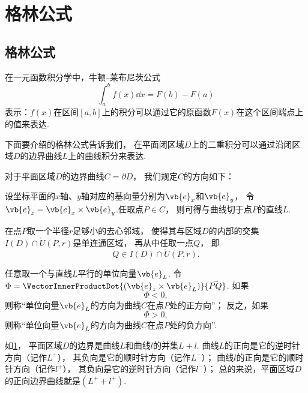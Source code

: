 \section{格林公式}
\subsection{格林公式}
在一元函数积分学中，牛顿--莱布尼茨公式\[
	\int_a^b f(x) \dd{x} = F(b) - F(a)
\]表示：\(f(x)\)在区间\([a,b]\)上的积分可以通过它的原函数\(F(x)\)在这个区间端点上的值来表达.

下面要介绍的格林公式告诉我们，
在平面闭区域\(D\)上的二重积分可以通过沿闭区域\(D\)的边界曲线\(L\)上的曲线积分来表达.

\begin{definition}\label{definition:线积分与面积分.平面闭区域的边界曲线的取向}
对于平面区域\(D\)的边界曲线\(C = \partial D\)，
我们规定\(C\)的方向如下：

设坐标平面的\(x\)轴、\(y\)轴对应的基向量分别为\(\vb{e}_x\)和\(\vb{e}_y\)，
令\(\vb{e}_z = \vb{e}_x \times \vb{e}_y\).任取点\(P \in C\)，
则可得与曲线切于点\(P\)的直线\(L\).

在点\(P\)取一个半径\(r\)足够小的去心邻域，
使得其与区域\(D\)的内部的交集\(I(D) \cap \mathring{U}(P,r)\)是单连通区域，
再从中任取一点\(Q\)，
即\[
	Q \in I(D) \cap \mathring{U}(P,r).
\]

任意取一个与直线\(L\)平行的单位向量\(\vb{e}_L\).
令\(\Phi = \VectorInnerProductDot{(\vb{e}_z \times \vb{e}_L)}{\vec{PQ}}\).
如果\[
	\Phi < 0,
\]
则称“单位向量\(\vb{e}_L\)的方向为曲线\(C\)在点\(P\)处的正方向”；
反之，如果\[
	\Phi > 0,
\]
则称“单位向量\(\vb{e}_L\)的方向为曲线\(C\)在点\(P\)处的负方向”.
\end{definition}
如\cref{figure:线积分与面积分.平面区域的边界曲线与其取向}，
平面区域\(D\)的边界是曲线\(L\)和曲线\(l\)的并集\(L+l\).
曲线\(L\)的正向是它的逆时针方向（记作\(L^+\)），
其负向是它的顺时针方向（记作\(L^-\)）；
曲线\(l\)的正向是它的顺时针方向（记作\(l^+\)），
其负向是它的逆时针方向（记作\(l^-\)）；
总的来说，平面区域\(D\)的正向边界曲线就是\((L^+ + l^+)\).

\begin{figure}[htb]
\centering
{}
\caption{}
\label{figure:线积分与面积分.平面区域的边界曲线与其取向}
\end{figure}

